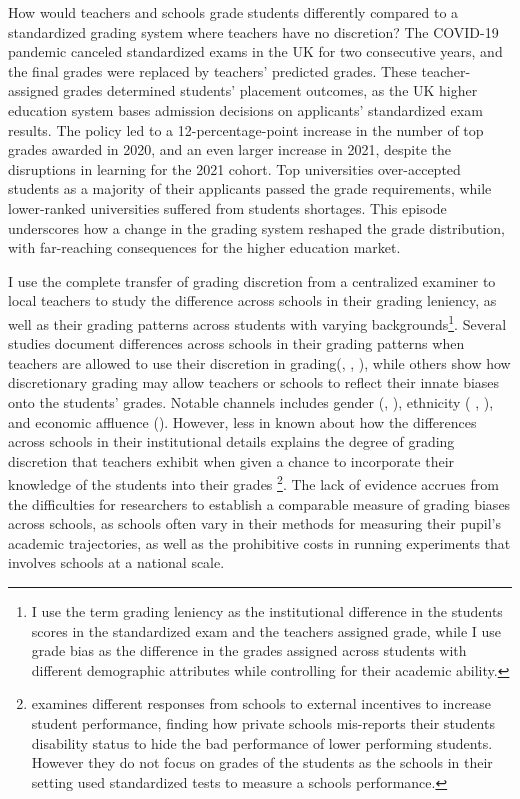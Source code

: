 
How would teachers and schools grade students differently compared to a standardized grading system where teachers have no discretion? The COVID-19 pandemic canceled standardized exams in the UK for two consecutive years, and the final grades were replaced by teachers’ predicted grades. These teacher-assigned grades determined students’ placement outcomes, as the UK higher education system bases admission decisions on applicants’ standardized exam results. The policy led to a 12-percentage-point increase in the number of top grades awarded in 2020, and an even larger increase in 2021, despite the disruptions in learning for the 2021 cohort. Top universities over-accepted students as a majority of their applicants passed the grade requirements, while lower-ranked universities suffered from students shortages. This episode underscores how a change in the grading system reshaped the grade distribution, with far-reaching consequences for the higher education market.

I use the complete transfer of grading discretion from a centralized examiner to local teachers to study the difference across schools in their grading leniency, as well as their grading patterns across students with varying backgrounds\footnote{I use the term grading leniency as the institutional difference in the students scores in the standardized exam and the teachers assigned grade, while I use grade bias as the difference in the grades assigned across students with different demographic attributes while controlling for their academic ability.}. Several studies document differences across schools in their grading patterns when teachers are allowed to use their discretion in grading(\cite{10.1162/00335530360698441}, \cite{figlio2006}, \cite{dee2019}), while others show how discretionary grading may allow teachers or schools to reflect their innate biases onto the students' grades. Notable channels includes gender (\cite{lavy2009}, \cite{10.1093/qje/qjz008}), ethnicity ( \cite{burgess2013}, \cite{Alesina2024}), and economic affluence (\cite{hanna2012}). However, less in known about how the differences across schools in their institutional details explains the degree of grading discretion that teachers exhibit when given a chance to incorporate their knowledge of the students into their grades \footnote{\cite{figlio2006} examines different responses from schools to external incentives to increase student performance, finding how private schools mis-reports their students disability status to hide the bad performance of lower performing students. However they do not focus on grades of the students as the schools in their setting used standardized tests to measure a schools performance.}. The lack of evidence accrues from the difficulties for researchers to establish a comparable measure of grading biases across schools, as schools often vary in their methods for measuring their pupil's academic trajectories, as well as the prohibitive costs in running experiments that involves schools at a national scale.

